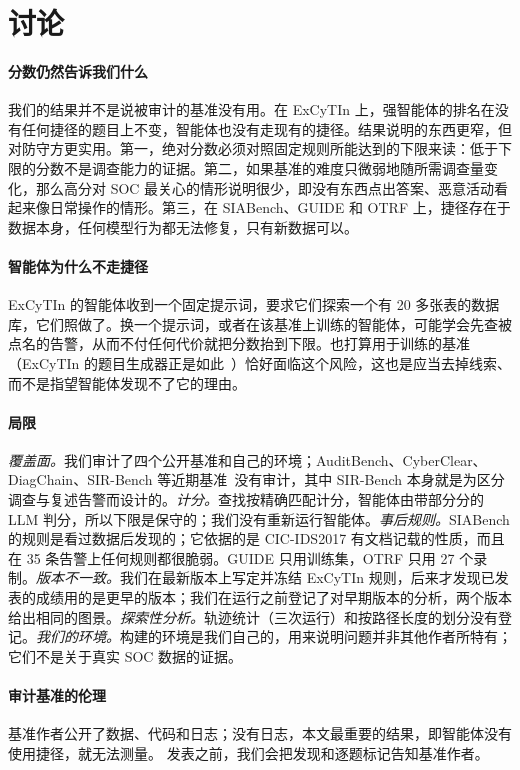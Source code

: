 \section{讨论}
\label{sec:discussion}

\paragraph{分数仍然告诉我们什么} 我们的结果并不是说被审计的基准没有用。在 ExCyTIn 上，强智能体的排名在没有任何捷径的题目上不变，智能体也没有走现有的捷径。结果说明的东西更窄，但对防守方更实用。第一，绝对分数必须对照固定规则所能达到的下限来读：低于下限的分数不是调查能力的证据。第二，如果基准的难度只微弱地随所需调查量变化，那么高分对 SOC 最关心的情形说明很少，即没有东西点出答案、恶意活动看起来像日常操作的情形。第三，在 SIABench、GUIDE 和 OTRF 上，捷径存在于数据本身，任何模型行为都无法修复，只有新数据可以。

\paragraph{智能体为什么不走捷径} ExCyTIn 的智能体收到一个固定提示词，要求它们探索一个有 20 多张表的数据库，它们照做了。换一个提示词，或者在该基准上训练的智能体，可能学会先查被点名的告警，从而不付任何代价就把分数抬到下限。也打算用于训练的基准（ExCyTIn 的题目生成器正是如此~\citep{excytin}）恰好面临这个风险，这也是应当去掉线索、而不是指望智能体发现不了它的理由。

\paragraph{局限} \emph{覆盖面。}我们审计了四个公开基准和自己的环境；AuditBench、CyberClear、DiagChain、SIR-Bench 等近期基准~\citep{auditbench,cyberclear,diagchain,sirbench}没有审计，其中 SIR-Bench 本身就是为区分调查与复述告警而设计的。\emph{计分。}查找按精确匹配计分，智能体由带部分分的 LLM 判分，所以下限是保守的；我们没有重新运行智能体。\emph{事后规则。}SIABench 的规则是看过数据后发现的；它依据的是 CIC-IDS2017 有文档记载的性质，而且在 35 条告警上任何规则都很脆弱。GUIDE 只用训练集，OTRF 只用 27 个录制。\emph{版本不一致。}我们在最新版本上写定并冻结 ExCyTIn 规则，后来才发现已发表的成绩用的是更早的版本；我们在运行之前登记了对早期版本的分析，两个版本给出相同的图景。\emph{探索性分析。}轨迹统计（三次运行）和按路径长度的划分没有登记。\emph{我们的环境。}构建的环境是我们自己的，用来说明问题并非其他作者所特有；它们不是关于真实 SOC 数据的证据。

\paragraph{审计基准的伦理} 基准作者公开了数据、代码和日志；没有日志，本文最重要的结果，即智能体没有使用捷径，就无法测量。 发表之前，我们会把发现和逐题标记告知基准作者。
